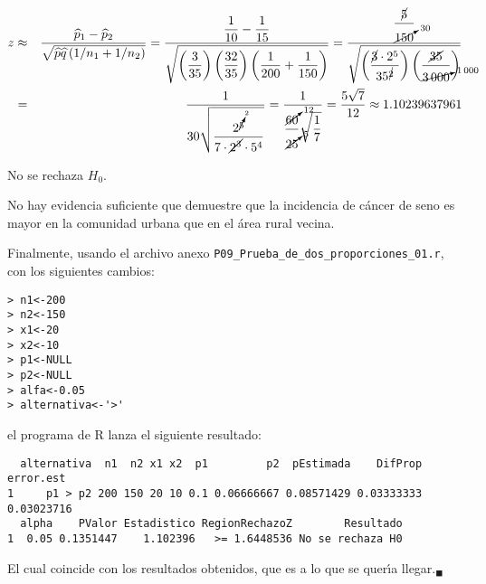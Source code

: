 \begin{solucion}
 \begin{estadistico}
  \begin{eqnarray*}
   z & \approx &
   \frac{\widehat{p}_1 - 
   \widehat{p}_2}{\sqrt{\widehat{p}\widehat{q}\left(1/n_1+1/n_2\right)}}
   = \frac{
   \displaystyle{ \frac{1}{10} - \frac{1}{15}}
   }{
   \displaystyle{ \sqrt{
   \left(\frac{3}{35}\right)\left(\frac{32}{35}\right)
   \left(\frac{1}{200} + \frac{1}{150}\right)
   }}}
   = \frac{\displaystyle{\frac{\cancel{5}}{\cancelto{30}{150}}}}
   {\displaystyle{
   \sqrt{\left( \frac{\cancel{3}\cdot 2^5}{35^{\cancel{2}}} \right)
   \left( \frac{\cancel{35}}{ \cancelto{1\,000}{3\,000} } \right)}
   }} \\
   & = & \frac{1}
   {\displaystyle{
   30\sqrt{\frac{ 2^{\cancelto{2}{5}} }{ 7 \cdot \cancel{2^3} \cdot 5^4  }}
   }}
   = \frac{1}{\displaystyle{
   \frac{\cancelto{12}{60}}{\cancelto{5}{25}}\sqrt{\frac{1}{7}}
   }}
   = \frac{5\sqrt{7}}{12}
   \approx 1.10239637961
  \end{eqnarray*}
 \end{estadistico}

 \begin{decision}
  No se rechaza $H_0$.
 \end{decision}

 \begin{conclusion}
  No hay evidencia suficiente
  que demuestre que la incidencia de c\'ancer de seno es mayor
  en la comunidad urbana que en el \'area rural vecina.
 \end{conclusion}

 Finalmente, usando el archivo anexo \texttt{P09\_Prueba\_de\_dos\_proporciones\_01.r}, con los siguientes cambios:
 \begin{verbatim}
> n1<-200
> n2<-150
> x1<-20
> x2<-10
> p1<-NULL
> p2<-NULL
> alfa<-0.05
> alternativa<-'>'
 \end{verbatim}
 \vspace{-0.5cm}
 el programa de R lanza el siguiente resultado:
 \begin{verbatim}
  alternativa  n1  n2 x1 x2  p1         p2  pEstimada    DifProp  error.est
1     p1 > p2 200 150 20 10 0.1 0.06666667 0.08571429 0.03333333 0.03023716
  alpha    PValor Estadistico RegionRechazoZ        Resultado
1  0.05 0.1351447    1.102396   >= 1.6448536 No se rechaza H0
 \end{verbatim}
 \vspace{-0.5cm}
 El cual coincide con los resultados obtenidos,
 que es a lo que se quer\'{\i}a llegar.${}_{\blacksquare}$
\end{solucion}
